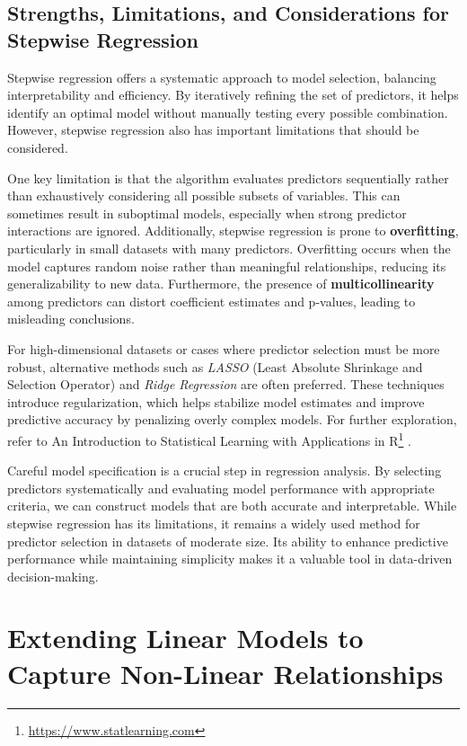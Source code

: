 \documentclass[
  11pt,
]{book}
\renewcommand{\href}[2]{#2\footnote{\url{#1}}}
\theoremstyle{definition}
\theoremstyle{definition}
\theoremstyle{definition}
\theoremstyle{definition}
\theoremstyle{remark}
\begin{document}
\subsection*{Strengths, Limitations, and Considerations for Stepwise Regression}\label{strengths-limitations-and-considerations-for-stepwise-regression}


Stepwise regression offers a systematic approach to model selection, balancing interpretability and efficiency. By iteratively refining the set of predictors, it helps identify an optimal model without manually testing every possible combination. However, stepwise regression also has important limitations that should be considered.

One key limitation is that the algorithm evaluates predictors sequentially rather than exhaustively considering all possible subsets of variables. This can sometimes result in suboptimal models, especially when strong predictor interactions are ignored. Additionally, stepwise regression is prone to \textbf{overfitting}, particularly in small datasets with many predictors. Overfitting occurs when the model captures random noise rather than meaningful relationships, reducing its generalizability to new data. Furthermore, the presence of \textbf{multicollinearity} among predictors can distort coefficient estimates and p-values, leading to misleading conclusions.

For high-dimensional datasets or cases where predictor selection must be more robust, alternative methods such as \emph{LASSO} (Least Absolute Shrinkage and Selection Operator) and \emph{Ridge Regression} are often preferred. These techniques introduce regularization, which helps stabilize model estimates and improve predictive accuracy by penalizing overly complex models. For further exploration, refer to \href{https://www.statlearning.com}{An Introduction to Statistical Learning with Applications in R} \citep{gareth2013introduction}.

Careful model specification is a crucial step in regression analysis. By selecting predictors systematically and evaluating model performance with appropriate criteria, we can construct models that are both accurate and interpretable. While stepwise regression has its limitations, it remains a widely used method for predictor selection in datasets of moderate size. Its ability to enhance predictive performance while maintaining simplicity makes it a valuable tool in data-driven decision-making.

\section{Extending Linear Models to Capture Non-Linear Relationships}\label{extending-linear-models-to-capture-non-linear-relationships}
\end{document}
